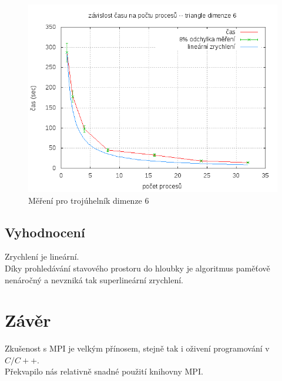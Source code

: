 \documentclass[12pt,a4paper]{article}
\begin{document}
\begin{figure}[h]
\includegraphics[width=\textwidth]{data6.png}
\caption{Měření pro trojúhelník dimenze 6}
\label{data6}
\end{figure}

\clearpage

\subsection{Vyhodnocení}

Zrychlení je lineární. \\

Díky prohledávání stavového prostoru do hloubky je algoritmus paměťově nenáročný a nevzniká tak superlineární zrychlení.


\section{Závěr}

Zkušenost s MPI je velkým přínosem, stejně tak i oživení programování v $ C/C++ $.\\

Překvapilo nás relativně snadné použití knihovny MPI.\\
\end{document}
